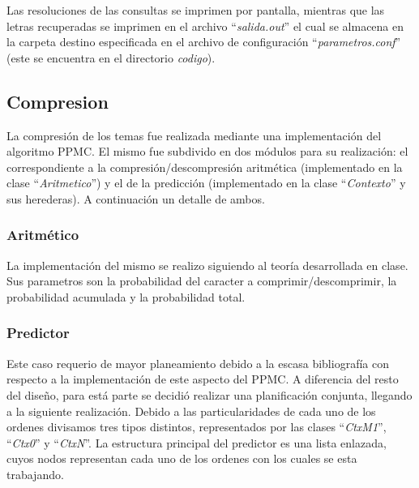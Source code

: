\documentclass{article}
\begin{document}
	Las resoluciones de las consultas se imprimen por pantalla, mientras que las letras recuperadas se imprimen en el archivo ``\textit{salida.out}'' el cual se almacena en la carpeta destino especificada en el archivo de configuración ``\textit{parametros.conf}'' (este se encuentra en el directorio \textit{codigo}).
\bigskip




\subsection{Compresion}
\medskip

	La compresión de los temas fue realizada mediante una implementación del algoritmo PPMC. El mismo fue subdivido en dos módulos para su realización: el correspondiente a la compresión/descompresión aritmética (implementado en la clase ``\textit{Aritmetico}'') y el de la predicción (implementado en la clase ``\textit{Contexto}'' y sus herederas). A continuación un detalle de ambos.

\bigskip



\subsubsection{Aritmético}
\medskip

	La implementación del mismo se realizo siguiendo al teoría desarrollada en clase. Sus parametros son la probabilidad del caracter a comprimir/descomprimir, la probabilidad acumulada y la probabilidad total. 

\bigskip


\subsubsection{Predictor}
\medskip

	Este caso requerio de mayor planeamiento debido a la escasa bibliografía con respecto a la implementación de este aspecto del PPMC. A diferencia del resto del diseño, para está parte se decidió realizar una planificación conjunta, llegando a la siguiente realización. Debido a las particularidades de cada uno de los ordenes divisamos tres tipos distintos, representados por las clases ``\textit{CtxM1}'', ``\textit{Ctx0}'' y ``\textit{CtxN}''. La estructura principal del predictor es una lista enlazada, cuyos nodos representan cada uno de los ordenes con los cuales se esta trabajando.
	\medskip
\end{document}
